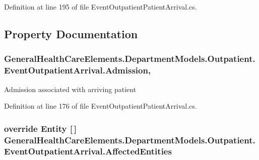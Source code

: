 Definition at line 195 of file Event\+Outpatient\+Patient\+Arrival.\+cs.



\subsection{Property Documentation}
\subsubsection[{\texorpdfstring{Admission}{Admission}}]{ General\+Health\+Care\+Elements.\+Department\+Models.\+Outpatient.\+Event\+Outpatient\+Arrival.\+Admission\hspace{0.3cm}{\ttfamily [get]}, {\ttfamily [set]}}\hypertarget{class_general_health_care_elements_1_1_department_models_1_1_outpatient_1_1_event_outpatient_arrival_ab05fe93fdc3d983524ab2f36f3c372d8}{}\label{class_general_health_care_elements_1_1_department_models_1_1_outpatient_1_1_event_outpatient_arrival_ab05fe93fdc3d983524ab2f36f3c372d8}


Admission associated with arriving patient 



Definition at line 176 of file Event\+Outpatient\+Patient\+Arrival.\+cs.

\subsubsection[{\texorpdfstring{Affected\+Entities}{AffectedEntities}}]{\setlength{\rightskip}{0pt plus 5cm}override {\bf Entity} \mbox{[}$\,$\mbox{]} General\+Health\+Care\+Elements.\+Department\+Models.\+Outpatient.\+Event\+Outpatient\+Arrival.\+Affected\+Entities\hspace{0.3cm}{\ttfamily [get]}}\hypertarget{class_general_health_care_elements_1_1_department_models_1_1_outpatient_1_1_event_outpatient_arrival_a50404aa639bb92512cab174c6a90cd55}{}\label{class_general_health_care_elements_1_1_department_models_1_1_outpatient_1_1_event_outpatient_arrival_a50404aa639bb92512cab174c6a90cd55}


